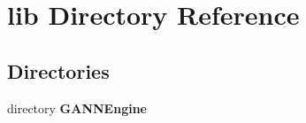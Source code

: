 \section{lib Directory Reference}
\label{dir_97aefd0d527b934f1d99a682da8fe6a9}
\subsection*{Directories}
\begin{DoxyCompactItemize}
\item 
directory {\bf G\+A\+N\+N\+Engine}
\end{DoxyCompactItemize}
